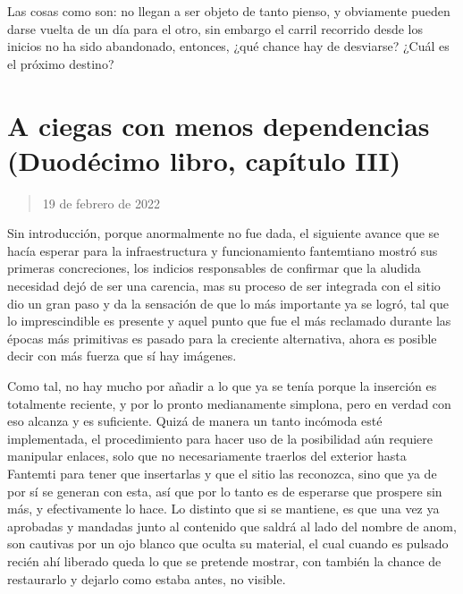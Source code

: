 \documentclass[
]{book}
\begin{document}
Las cosas como son: no llegan a ser objeto de tanto pienso, y obviamente pueden darse vuelta de un día para el otro, sin embargo el carril recorrido desde los inicios no ha sido abandonado, entonces, ¿qué chance hay de desviarse? ¿Cuál es el próximo destino?

\hypertarget{a-ciegas-con-menos-dependencias-duoduxe9cimo-libro-capuxedtulo-iii}{%
\section{A ciegas con menos dependencias (Duodécimo libro, capítulo III)}\label{a-ciegas-con-menos-dependencias-duoduxe9cimo-libro-capuxedtulo-iii}}

\begin{quote}
19 de febrero de 2022
\end{quote}

Sin introducción, porque anormalmente no fue dada, el siguiente avance que se hacía esperar para la infraestructura y funcionamiento fantemtiano mostró sus primeras concreciones, los indicios responsables de confirmar que la aludida necesidad dejó de ser una carencia, mas su proceso de ser integrada con el sitio dio un gran paso y da la sensación de que lo más importante ya se logró, tal que lo imprescindible es presente y aquel punto que fue el más reclamado durante las épocas más primitivas es pasado para la creciente alternativa, ahora es posible decir con más fuerza que sí hay imágenes.

Como tal, no hay mucho por añadir a lo que ya se tenía porque la inserción es totalmente reciente, y por lo pronto medianamente simplona, pero en verdad con eso alcanza y es suficiente. Quizá de manera un tanto incómoda esté implementada, el procedimiento para hacer uso de la posibilidad aún requiere manipular enlaces, solo que no necesariamente traerlos del exterior hasta Fantemti para tener que insertarlas y que el sitio las reconozca, sino que ya de por sí se generan con esta, así que por lo tanto es de esperarse que prospere sin más, y efectivamente lo hace. Lo distinto que si se mantiene, es que una vez ya aprobadas y mandadas junto al contenido que saldrá al lado del nombre de anom, son cautivas por un ojo blanco que oculta su material, el cual cuando es pulsado recién ahí liberado queda lo que se pretende mostrar, con también la chance de restaurarlo y dejarlo como estaba antes, no visible.
\end{document}
